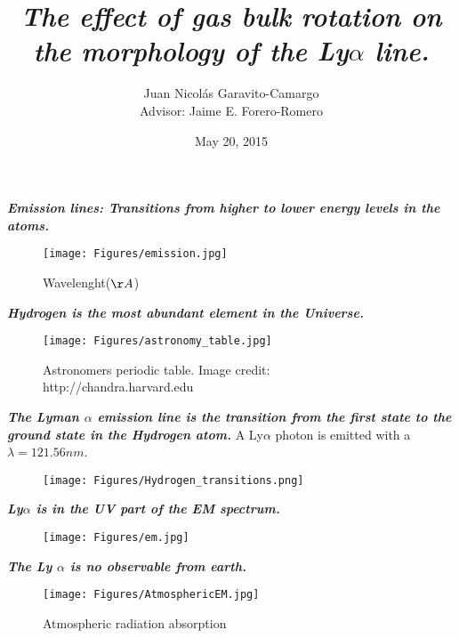 \documentclass{beamer}
\title{\textit{\textbf{The effect of gas bulk rotation on the morphology of the Ly$\alpha$ line.}}}
\author{Juan Nicol\'as Garavito-Camargo \\ Advisor: Jaime E. Forero-Romero}
\institute{Universidad de los Andes, Bogot\'a, Colombia}
\date{May 20, 2015}
\begin{document}

\begin{frame}{\textit{\textbf{Emission lines: Transitions from higher to lower energy levels in the atoms.}}}
\begin{figure}
\texttt{[image: Figures/emission.jpg]}
\caption*{Wavelenght($\AA$)}
\end{figure}
\end{frame}

\begin{frame}{\textit{\textbf{Hydrogen is the most abundant element in the Universe.}}}
\begin{figure}
\texttt{[image: Figures/astronomy\_table.jpg]}
\caption{Astronomers periodic table. Image credit: http://chandra.harvard.edu}
\end{figure}
\end{frame}



\begin{frame}{\textit{\textbf{The Lyman $\alpha$ emission line is the transition from the first state to the ground state in the Hydrogen atom.}}}
A Ly$\alpha$ photon is emitted with a $\lambda= 121.56 nm$.
\begin{figure}
\texttt{[image: Figures/Hydrogen\_transitions.png]}
\end{figure}
\end{frame}

\begin{frame}{\textit{\textbf{Ly$\alpha$ is in the UV part of the EM spectrum.}}}
\begin{figure}
\centering
\texttt{[image: Figures/em.jpg]}
\end{figure}
\end{frame}


\begin{frame}{\textit{\textbf{The Ly $\alpha$ is no observable from earth.}}}
\begin{figure}
\texttt{[image: Figures/AtmosphericEM.jpg]}
\caption*{Atmospheric radiation absorption}
\end{figure}
\end{frame}
\end{document}
